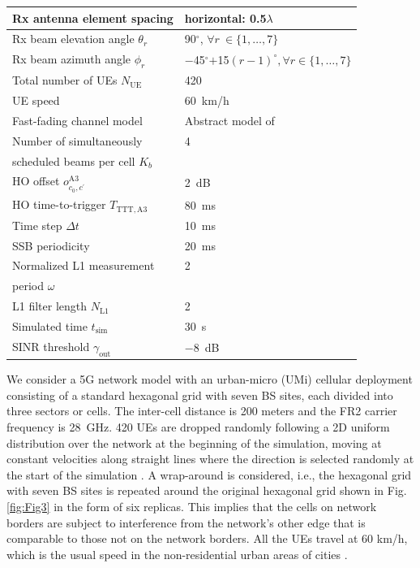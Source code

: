 \documentclass[10pt, conference]{IEEEtran}
\begin{document}
\begin{table}[!t]
\begin{tabular}{|l | l|}
\hline
Rx antenna element spacing & horizontal: 0.5$\lambda$\\
\hline
Rx beam elevation angle $\theta_r$ & 90$^{\circ}$, $\forall r~\in \{1,\ldots,7\}$ \\
\hline
Rx beam azimuth angle $\phi_r$ & $-$45$^{\circ}$$+$15$(r-1)^{\circ}, \forall r \in \{1,\ldots,7\}$\\
\hline
Total number of UEs $N_\mathrm{UE}$ & 420\\
\hline
UE speed  & \SI{60}{km/h}\\
\hline
Fast-fading channel model & Abstract model of \cite{b15}\\
\hline
Number of simultaneously   & 4\\
scheduled beams per cell $K_b$ & \\ 
\hline
HO offset $o^\mathrm{A3}_{c_0, c^{\prime}}$  & \SI{2}{dB}\\
\hline
HO time-to-trigger $T_\mathrm{TTT,A3}$ & \SI{80}{ms}\\
\hline
Time step $\Delta t$  & \SI{10}{ms}\\
\hline
SSB periodicity & \SI{20}{ms}\\
\hline
Normalized L1 measurement  & 2\\
period $\omega$ &  \\
\hline
L1 filter length $N_\mathrm{L1}$ & 2\\
\hline
Simulated time $t_\mathrm{sim}$ & \SI{30}{s} \\
\hline
SINR threshold $\gamma_\mathrm{out}$  & \SI{-8}{dB} \\
\hline
\end{tabular}
\label{Table2}
\end{table}

We consider a 5G network model with an urban-micro (UMi) cellular deployment consisting of a standard hexagonal grid with seven BS sites, each divided into three sectors or cells. The inter-cell distance is 200 meters and the FR2 carrier frequency is \SI{28}{GHz}. 420 UEs are dropped randomly following a 2D uniform distribution over the network at the beginning of the simulation, moving at constant velocities along straight lines where the direction is selected randomly at the start of the simulation \cite[Table 7.8-5]{b12}. A wrap-around \cite[pp. 140]{b13} is considered, i.e., the hexagonal grid with seven BS sites is repeated around the original hexagonal grid shown in Fig.\,\ref{fig:Fig3} in the form of six replicas. This implies that the cells on network borders are subject to interference from the network's other edge that is comparable to those not on the network borders. All the UEs travel at 60 km/h, which is the usual speed in the non-residential urban areas of cities \cite{b14}. 
\end{document}
